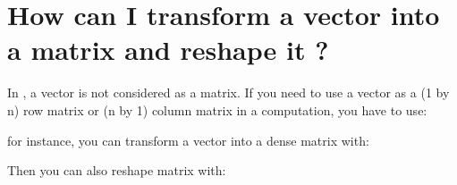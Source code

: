 \documentclass[a4paper,11pt,english]{sphinxmanual}
\begin{document}
\section{How can I transform a vector into a matrix and reshape it ?}
\label{\detokenize{gmm/first-step:how-can-i-transform-a-vector-into-a-matrix-and-reshape-it}}
\sphinxAtStartPar
In , a vector is not considered as a matrix. If you need to use a vector as a (1 by n) row matrix or (n by 1) column matrix in a computation, you have to use:

\begin{sphinxVerbatim}[commandchars=\\\{\}]
 
 
\end{sphinxVerbatim}

\sphinxAtStartPar
for instance, you can transform a vector into a dense matrix with:

\begin{sphinxVerbatim}[commandchars=\\\{\}]
 


  
 
\end{sphinxVerbatim}

\sphinxAtStartPar
Then you can also reshape matrix  with:

\begin{sphinxVerbatim}[commandchars=\\\{\}]
  
\end{sphinxVerbatim}
\end{document}
